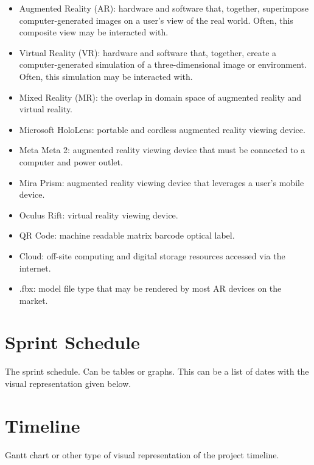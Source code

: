 \begin{itemize}
	\item Augmented Reality (AR): hardware and software that, together, superimpose computer-generated images on a user's view of the real world. Often, this composite view may be interacted with. 

	\item Virtual Reality (VR): hardware and software that, together, create a computer-generated simulation of a three-dimensional image or environment. Often, this simulation may be interacted with. 

	\item Mixed Reality (MR): the overlap in domain space of augmented reality and virtual reality. 

	\item Microsoft HoloLens: portable and cordless augmented reality viewing device. 

	\item Meta Meta 2: augmented reality viewing device that must be connected to a computer and power outlet. 

	\item Mira Prism: augmented reality viewing device that leverages a user's mobile device.

	\item Oculus Rift: virtual reality viewing device. 

	\item QR Code: machine readable matrix barcode optical label.

	\item Cloud: off-site computing and digital storage resources accessed via the internet. 

	\item .fbx: model file type that may be rendered by most AR devices on the market. 
\end{itemize}


\section{Sprint Schedule}
The sprint schedule.  Can be tables or graphs.   This can be a list of dates with the visual 
representation given below.

\section{Timeline}
Gantt chart or other type of visual representation of the project timeline.

